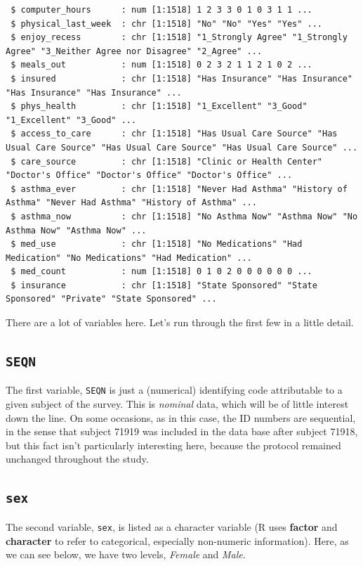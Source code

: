 \documentclass[
]{book}
\begin{document}
\begin{verbatim}
 $ computer_hours      : num [1:1518] 1 2 3 3 0 1 0 3 1 1 ...
 $ physical_last_week  : chr [1:1518] "No" "No" "Yes" "Yes" ...
 $ enjoy_recess        : chr [1:1518] "1_Strongly Agree" "1_Strongly Agree" "3_Neither Agree nor Disagree" "2_Agree" ...
 $ meals_out           : num [1:1518] 0 2 3 2 1 1 2 1 0 2 ...
 $ insured             : chr [1:1518] "Has Insurance" "Has Insurance" "Has Insurance" "Has Insurance" ...
 $ phys_health         : chr [1:1518] "1_Excellent" "3_Good" "1_Excellent" "3_Good" ...
 $ access_to_care      : chr [1:1518] "Has Usual Care Source" "Has Usual Care Source" "Has Usual Care Source" "Has Usual Care Source" ...
 $ care_source         : chr [1:1518] "Clinic or Health Center" "Doctor's Office" "Doctor's Office" "Doctor's Office" ...
 $ asthma_ever         : chr [1:1518] "Never Had Asthma" "History of Asthma" "Never Had Asthma" "History of Asthma" ...
 $ asthma_now          : chr [1:1518] "No Asthma Now" "Asthma Now" "No Asthma Now" "Asthma Now" ...
 $ med_use             : chr [1:1518] "No Medications" "Had Medication" "No Medications" "Had Medication" ...
 $ med_count           : num [1:1518] 0 1 0 2 0 0 0 0 0 0 ...
 $ insurance           : chr [1:1518] "State Sponsored" "State Sponsored" "Private" "State Sponsored" ...
\end{verbatim}

There are a lot of variables here. Let's run through the first few in a little detail.

\hypertarget{seqn}{%
\subsection{\texorpdfstring{\texttt{SEQN}}{SEQN}}\label{seqn}}

The first variable, \texttt{SEQN} is just a (numerical) identifying code attributable to a given subject of the survey. This is \emph{nominal} data, which will be of little interest down the line. On some occasions, as in this case, the ID numbers are sequential, in the sense that subject 71919 was included in the data base after subject 71918, but this fact isn't particularly interesting here, because the protocol remained unchanged throughout the study.

\hypertarget{sex}{%
\subsection{\texorpdfstring{\texttt{sex}}{sex}}\label{sex}}

The second variable, \texttt{sex}, is listed as a character variable (R uses \textbf{factor} and \textbf{character} to refer to categorical, especially non-numeric information). Here, as we can see below, we have two levels, \emph{Female} and \emph{Male}.
\end{document}
